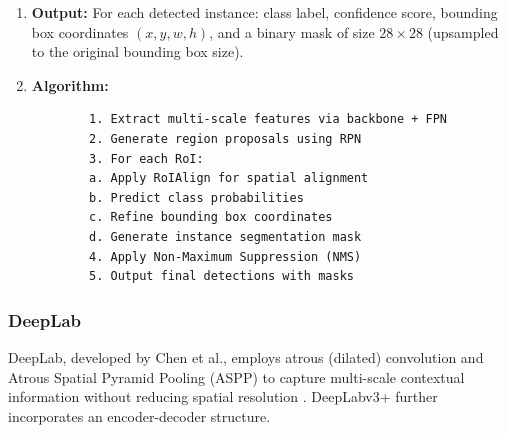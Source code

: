 \documentclass[conference]{IEEEtran}
\begin{document}
\begin{enumerate}
	\item \textbf{Output:}
	For each detected instance: class label, confidence score, bounding box coordinates $(x, y, w, h)$, and a binary mask of size $28 \times 28$ (upsampled to the original bounding box size).
	
	\item \textbf{Algorithm:}
	\begin{lstlisting}
		1. Extract multi-scale features via backbone + FPN
		2. Generate region proposals using RPN
		3. For each RoI:
		a. Apply RoIAlign for spatial alignment
		b. Predict class probabilities
		c. Refine bounding box coordinates
		d. Generate instance segmentation mask
		4. Apply Non-Maximum Suppression (NMS)
		5. Output final detections with masks
	\end{lstlisting}
\end{enumerate}

\subsubsection{DeepLab}
DeepLab, developed by Chen et al., employs atrous (dilated) convolution and Atrous Spatial Pyramid Pooling (ASPP) to capture multi-scale contextual information without reducing spatial resolution \cite{chen2017deeplab}. DeepLabv3+ further incorporates an encoder-decoder structure.
\end{document}

